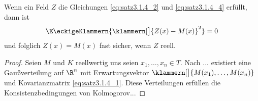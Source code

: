 \begin{bemerkung}
	Wenn ein Feld $Z$ die Gleichungen \eqref{eq:satz3.1.4_2} und \eqref{eq:satz3.1.4_4} erfüllt, dann ist
	\begin{align*}
		\E\eckigeKlammern{\klammern[\big]{Z(x)-M(x)}^2}=0
	\end{align*}
	und folglich $Z(x)=M(x)$ fast sicher, wenn $Z$ reell.
\end{bemerkung}

\begin{proof}
	Seien $M$ und $K$ reellwertig uns seien $x_1,\ldots,x_n\in T$.
	Nach ... existiert eine Gaußverteilung auf $\R^n$  mit Erwartungsvektor
	$\klammern[\big]{M(x_1),\ldots,M(x_n)}$ und Kovarianzmatrix \eqref{eq:satz3.1.4_1}.
	Diese Verteilungen erfüllen die Konsistenzbedingungen von Kolmogorov...
\end{proof}

